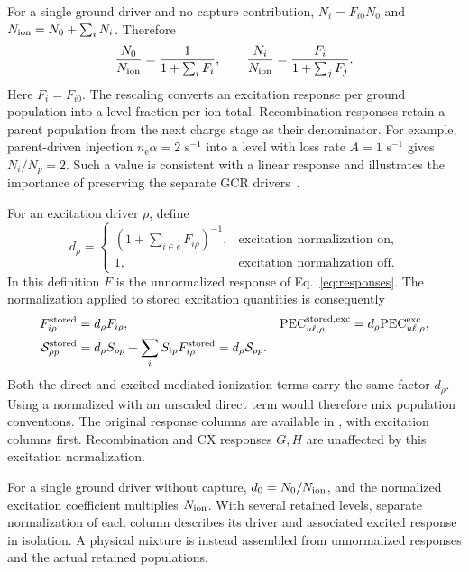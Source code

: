 \documentclass[11pt,a4paper]{article}
\newcommand{\code}[1]{\texttt{\detokenize{#1}}}
\newcommand{\nelec}{n_{\mathrm e}}
\numberwithin{equation}{section}
\begin{document}
For a single ground driver and no capture contribution,
$N_i=F_{i0}N_0$ and $N_{\rm ion}=N_0+\sum_iN_i$. Therefore
\begin{equation}
 \frac{N_0}{N_{\rm ion}}=\frac{1}{1+\sum_iF_i},\qquad
 \frac{N_i}{N_{\rm ion}}=\frac{F_i}{1+\sum_jF_j}.
\end{equation}
Here $F_i=F_{i0}$. The rescaling converts an excitation response per
ground population into a level fraction per ion total. Recombination
responses retain a parent population from the next charge stage as
their denominator. For example, parent-driven injection
$\nelec\alpha=2$ s$^{-1}$ into a level with loss rate $A=1$ s$^{-1}$
gives $N_i/N_p=2$. Such a value is consistent with a linear response
and illustrates the importance of preserving the separate GCR
drivers~\cite{adasreport}.

For an excitation driver $\rho$, define
\begin{equation}\label{eq:stored-normalization}
 d_\rho=\begin{cases}
 (1+\sum_{i\in e}F_{i\rho})^{-1},&\text{excitation normalization on},\\
 1,&\text{excitation normalization off}.
 \end{cases}
\end{equation}
In this definition $F$ is the unnormalized response of
Eq.~\eqref{eq:responses}. The normalization applied to stored
excitation quantities is consequently
\begin{align}
 F^{\rm stored}_{i\rho}&=d_\rho F_{i\rho}, &
 \mathrm{PEC}^{\rm stored,exc}_{u\ell,\rho}
   &=d_\rho\mathrm{PEC}^{\rm exc}_{u\ell,\rho},\nonumber\\
 \mathcal S^{\rm stored}_{\rho p}
   &=d_\rho S_{\rho p}+\sum_iS_{ip}F^{\rm stored}_{i\rho}
    =d_\rho\mathcal S_{\rho p}.\label{eq:stored-scd}
\end{align}
Both the direct and excited-mediated ionization terms carry the same
factor $d_\rho$. Using a normalized \code{processed['F']} with an
unscaled direct term would therefore mix population conventions.
The original response columns are available in
\code{processed['pops_no_norm']}, with excitation columns first.
Recombination and CX responses $G,H$ are unaffected by this excitation
normalization.

For a single ground driver without capture, $d_0=N_0/N_{\rm ion}$,
and the normalized excitation coefficient multiplies $N_{\rm ion}$.
With several retained levels, separate normalization of each column
describes its driver and associated excited response in isolation.
A physical mixture is instead assembled from unnormalized responses
and the actual retained populations.
\end{document}
